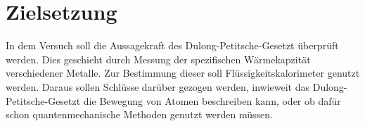 \section{Zielsetzung}
\label{sec:Zielsetzung}

In dem Versuch soll die Aussagekraft des Dulong-Petitsche-Gesetzt überprüft werden.
Dies geschieht durch Messung der spezifischen Wärmekapzität verschiedener Metalle.
Zur Bestimmung dieser soll Flüssigkeitskalorimeter genutzt werden.
Daraus sollen Schlüsse darüber gezogen werden, inwieweit das Dulong-Petitsche-Gesetzt die Bewegung von Atomen beschreiben kann, oder ob dafür schon quantenmechanische Methoden genutzt werden müssen.